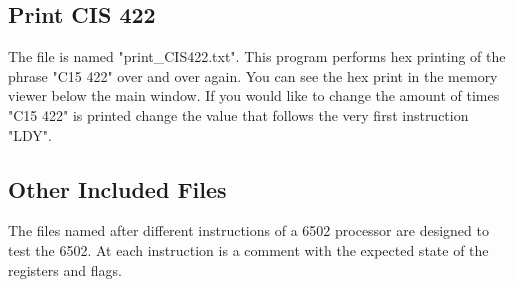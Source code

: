 \documentclass[a3paper, 11pt]{article}
\begin{document}
\subsection{Print CIS 422}
The file is named "print\_CIS422.txt". This program performs hex printing of the phrase "C15 422" over and over again. You can see the hex print in the memory viewer below the main window. If you would like to change the amount of times "C15 422" is printed change the value that follows the very first instruction "LDY".
\subsection{Other Included Files}
The files named after different instructions of a 6502 processor are designed to test the 6502. At each instruction is a comment with the expected state of the registers and flags.
\clearpage
\end{document}
